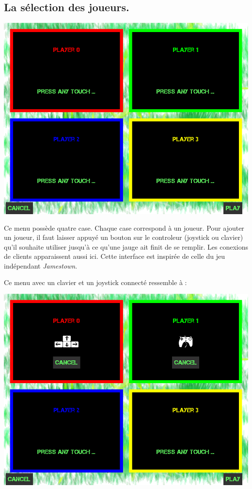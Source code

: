 \documentclass{article}
\begin{document}
\subsection{La sélection des joueurs.} \label{select}
\begin{center}
	\includegraphics[scale=0.4]{img/empty.png}
\end{center}
Ce menu possède quatre case. Chaque case correspond à un joueur. Pour ajouter un joueur, il faut laisser appuyé un bouton sur le controleur (joystick ou clavier) qu'il souhaite utiliser jusqu'à ce qu'une jauge ait finit de se remplir. Les conexions de clients apparaissent aussi ici. Cette interface est inspirée de celle du jeu indépendant \emph{Jamestown}.

Ce menu avec un clavier et un joystick connecté ressemble à :
\begin{center}
	\includegraphics[scale=0.4]{img/full.png}
\end{center}
\end{document}
